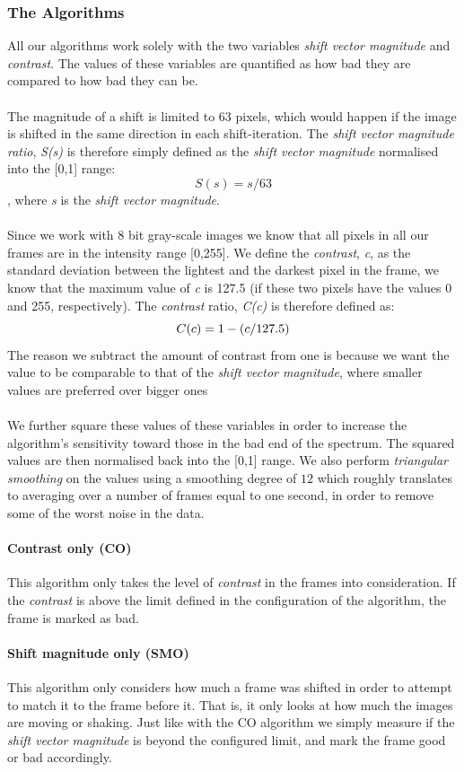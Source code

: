 \subsubsection{The Algorithms}
%
All our algorithms work solely with the two variables \textit{shift vector magnitude} and \textit{contrast}. The values of these variables are quantified as how bad they are compared to how bad they can be.\\
\\
The magnitude of a shift is limited to 63 pixels, which would happen if the image is shifted in the same direction in each shift-iteration. The \textit{shift vector magnitude ratio}, \textit{S(s)} is therefore simply defined as the \textit{shift vector magnitude} normalised into the [0,1] range:
\[
S(s) = s / 63 
\]
, where \textit{s} is the \textit{shift vector magnitude}.\\
\\
Since we work with 8 bit gray-scale images we know that all pixels in all our frames are in the intensity range [0,255]. We define the \textit{contrast}, \textit{c}, as the standard deviation between the lightest and the darkest pixel in the frame, we know that the maximum value of \textit{c} is 127.5 (if these two pixels have the values 0 and 255, respectively). The \textit{contrast} ratio, \textit{C(c)} is therefore defined as:
\[
C(c) = 1 - (c / 127.5)\\
\]
The reason we subtract the amount of contrast from one is because we want the value to be comparable to that of the \textit{shift vector magnitude}, where smaller values are preferred over bigger ones\\
\\
We further square these values of these variables in order to increase the algorithm’s sensitivity toward those in the bad end of the spectrum. The squared values are then normalised back into the [0,1] range. We also perform \textit{triangular smoothing} on the values using a smoothing degree of $12$ which roughly translates to averaging over a number of frames equal to one second, in order to remove some of the worst noise in the data.
%
\paragraph{Contrast only (CO)}
This algorithm only takes the level of \textit{contrast} in the frames into consideration. If the \textit{contrast} is above the limit defined in the configuration of the algorithm, the frame is marked as bad.
%
\paragraph{Shift magnitude only (SMO)}
This algorithm only considers how much a frame was shifted in order to attempt to match it to the frame before it. That is, it only looks at how much the images are moving or shaking. Just like with the CO algorithm we simply measure if the \textit{shift vector magnitude} is beyond the configured limit, and mark the frame good or bad accordingly.
%
